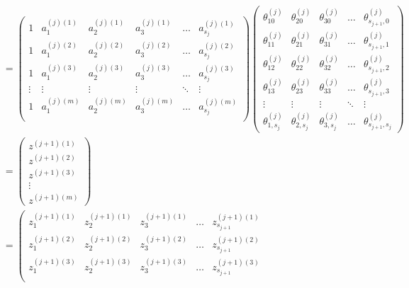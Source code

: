 \begin{enumerate}
\begin{equation}
\begin{aligned}
		\\ &= 
		  \left(\begin{matrix}
				1 & a_1^{(j)(1)} & a_2^{(j)(1)} & a_3^{(j)(1)} & \dots & a_{s_j}^{(j)(1)} \\
				1 & a_1^{(j)(2)} & a_2^{(j)(2)} & a_3^{(j)(2)} & \dots & a_{s_j}^{(j)(2)} \\
				1 & a_1^{(j)(3)} & a_2^{(j)(3)} & a_3^{(j)(3)} & \dots & a_{s_j}^{(j)(3)} \\
				\vdots        & \vdots    & \vdots    & \vdots    & \ddots & \vdots   \\
				1 & a_1^{(j)(m)} & a_2^{(j)(m)} & a_3^{(j)(m)} & \dots & a_{s_j}^{(j)(m)} \\
			\end{matrix}\right)
			\left(\begin{matrix}
				\theta_{10}^{(j)} & \theta_{20}^{(j)} & \theta_{30}^{(j)} & \dots & \theta_{s_{j+1},0}^{(j)} \\
				\theta_{11}^{(j)} & \theta_{21}^{(j)} & \theta_{31}^{(j)} & \dots & \theta_{s_{j+1},1}^{(j)} \\
				\theta_{12}^{(j)} & \theta_{22}^{(j)} & \theta_{32}^{(j)} & \dots & \theta_{s_{j+1},2}^{(j)} \\
				\theta_{13}^{(j)} & \theta_{23}^{(j)} & \theta_{33}^{(j)} & \dots & \theta_{s_{j+1},3}^{(j)} \\
				\vdots    & \vdots    & \vdots    & \ddots & \vdots   \\
				\theta_{1,s_j}^{(j)} & \theta_{2,s_j}^{(j)} & \theta_{3,s_j}^{(j)} & \dots & \theta_{s_{j+1},s_j}^{(j)}
			\end{matrix}\right)
		\\ &=
			\left(\begin{matrix}
				z^{(j+1)(1)} \\ z^{(j+1)(2)} \\ z^{(j+1)(3)} \\ \vdots \\ z^{(j+1)(m)} 
			\end{matrix}\right)
		\\ &= 
			\left(\begin{matrix}
				z_1^{(j+1)(1)} & z_2^{(j+1)(1)} & z_3^{(j+1)(1)} & \dots & z_{s_{j+1}}^{(j+1)(1)} \\
				z_1^{(j+1)(2)} & z_2^{(j+1)(2)} & z_3^{(j+1)(2)} & \dots & z_{s_{j+1}}^{(j+1)(2)} \\
				z_1^{(j+1)(3)} & z_2^{(j+1)(3)} & z_3^{(j+1)(3)} & \dots & z_{s_{j+1}}^{(j+1)(3)} \\

\end{matrix}
\end{aligned}
\end{equation}
\end{enumerate}

